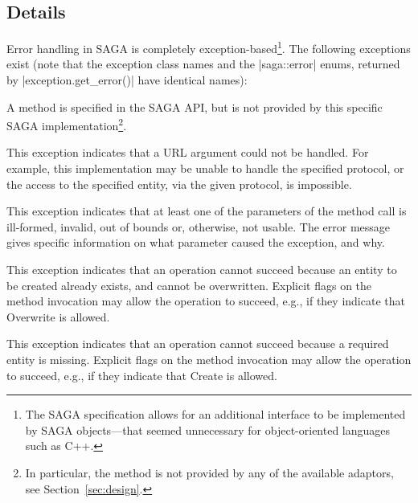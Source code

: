 \subsection{Details}

 Error handling in SAGA is completely exception-based\footnote{The
 SAGA specification allows for an additional 
 interface to be implemented by SAGA objects---that seemed
 unnecessary for object-oriented languages such as C++.}.  The
 following exceptions exist (note that the exception class names and
 the |saga::error| enums, returned by |exception.get_error()| have
 identical names):

 \begin{description}

  \item{}
  
    A method is specified in the SAGA API, but is not provided
    by this specific SAGA implementation\footnote{In particular,
    the method is not provided by any of the available adaptors,
    see Section~\ref{sec:design}.}.
    

  \item{}
  
   This exception indicates that a URL argument could not be
   handled.  For example, this implementation may be unable to
   handle the specified protocol, or the access to the specified
   entity, via the given protocol, is impossible.


  \item{}

   This exception indicates that at least one of the parameters
   of the method call is ill-formed, invalid, out of bounds or,
   otherwise, not usable.  The error message gives specific
   information on what parameter caused the exception, and why.


  \item{}

   This exception indicates that an operation cannot succeed
   because an entity to be created already exists, and cannot be
   overwritten.  Explicit flags on the method invocation may
   allow the operation to succeed, e.g., if they indicate that
   Overwrite is allowed.


  \item{}

   This exception indicates that an operation cannot succeed
   because a required entity is missing.  Explicit flags on the
   method invocation may allow the operation to succeed, e.g.,
   if they indicate that Create is allowed.



\end{description}
